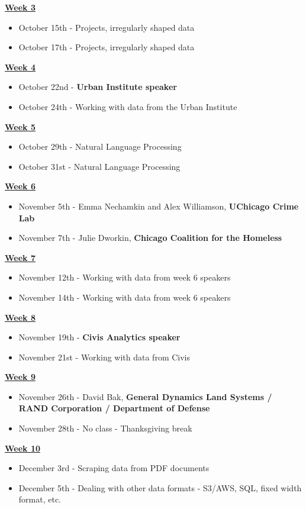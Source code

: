 \documentclass{article}
\begin{document}
\noindent
\textbf{\underline{Week 3}}
\begin{itemize}
\item October 15th - Projects, irregularly shaped data
\item October 17th - Projects, irregularly shaped data
\end{itemize}
\bigskip

\noindent
\textbf{\underline{Week 4}}
\begin{itemize}
\item October 22nd - \textbf{Urban Institute speaker}
\item October 24th - Working with data from the Urban Institute
\end{itemize}
\bigskip

\noindent
\textbf{\underline{Week 5}}
\begin{itemize}
\item October 29th - Natural Language Processing
\item October 31st - Natural Language Processing
\end{itemize}
\bigskip

\noindent
\textbf{\underline{Week 6}}
\begin{itemize}
\item November 5th - Emma Nechamkin and Alex Williamson, \textbf{UChicago Crime Lab}
\item November 7th - Julie Dworkin, \textbf{Chicago Coalition for the Homeless}
\end{itemize}
\bigskip

\noindent
\textbf{\underline{Week 7}}
\begin{itemize}
\item November 12th - Working with data from week 6 speakers
\item November 14th - Working with data from week 6 speakers
\end{itemize}
\bigskip

\noindent
\textbf{\underline{Week 8}}
\begin{itemize}
\item November 19th - \textbf{Civis Analytics speaker}
\item November 21st - Working with data from Civis
\end{itemize}
\bigskip

\noindent
\textbf{\underline{Week 9}}
\begin{itemize}
\item November 26th - David Bak, \textbf{General Dynamics Land Systems / RAND Corporation / Department of Defense}
\item November 28th - No class - Thanksgiving break
\end{itemize}
\bigskip

\noindent
\textbf{\underline{Week 10}}
\begin{itemize}
\item December 3rd - Scraping data from PDF documents
\item December 5th - Dealing with other data formats - S3/AWS, SQL, fixed width format, etc.
\end{itemize}
\bigskip
\end{document}
